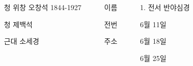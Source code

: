\documentclass[	20pt, 
							a0paper, 
							landscape, %
							margin=0mm, %
							innermargin=10mm,  		%
							colspace=5mm, 
							subcolspace=0mm
							]{tikzposter}
\begin{document}
\begin{columns}
{			\begin{LARGE}
			\begin{itemize}
			\item [청] 위창 오창석 1844-1927
			\item [청] 제백석
			\item [근대] 소세경
			\end{itemize}
			\end{LARGE}

		}

		{
			\setlength{\leftmargini}{7em}			
			\setlength{\labelsep}{1em} %

			\begin{LARGE}
			\begin{itemize}
			\item [이름]
			\item [전번]
			\item [주소] 
			\end{itemize}
			\end{LARGE}

		}






			{				
			\setlength{\leftmargini}{9em}			
			\setlength{\labelsep}{1em} %

			\begin{LARGE}
			\begin{itemize}
			\item [1.] 전서 반야심경
			\item [6월 11일]
			\item [6월 18일]
			\item [6월 25일]
			\end{itemize}
			\end{LARGE}
		}





	\end{columns}
\end{document}

